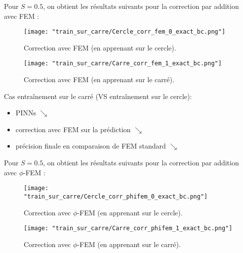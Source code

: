 Pour $S=0.5$, on obtient les résultats suivants pour la correction par addition avec FEM :

\vspace{-20pt}
\begin{center}
	\begin{minipage}{0.48\linewidth}
		\begin{figure}[H]
			\centering
			\texttt{[image: "train\_sur\_carre/Cercle\_corr\_fem\_0\_exact\_bc.png"]}
			\caption{Correction avec FEM (en apprenant sur le cercle).}
		\end{figure}
	\end{minipage}
	\begin{minipage}{0.48\linewidth}
		\begin{figure}[H]
			\centering
			\texttt{[image: "train\_sur\_carre/Carre\_corr\_fem\_1\_exact\_bc.png"]}
			\caption{Correction avec FEM (en apprenant sur le carré).}
		\end{figure}
	\end{minipage}
\end{center}

\begin{Obs}
	Cas entraînement sur le carré (VS entraînement sur le cercle):
	\begin{itemize}
		\item PINNs $\searrow$
		\item correction avec FEM sur la prédiction $\searrow$
		\item précision finale en comparaison de FEM standard $\searrow$
	\end{itemize}
\end{Obs}

Pour $S=0.5$, on obtient les résultats suivants pour la correction par addition avec $\phi$-FEM :

\begin{minipage}{0.48\linewidth}
	\begin{figure}[H]
		\centering
		\texttt{[image: "train\_sur\_carre/Cercle\_corr\_phifem\_0\_exact\_bc.png"]}
		\caption{Correction avec $\phi$-FEM (en apprenant sur le cercle).}
	\end{figure}
\end{minipage}
\begin{minipage}{0.48\linewidth}
	\begin{figure}[H]
		\centering
		\texttt{[image: "train\_sur\_carre/Carre\_corr\_phifem\_1\_exact\_bc.png"]}
		\caption{Correction avec $\phi$-FEM (en apprenant sur le carré).}
	\end{figure}
\end{minipage}

